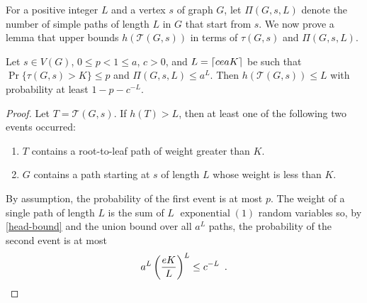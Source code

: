 \documentclass{patmorin}
\DeclareMathOperator{\exponential}{exponential}
\newcommand{\abas}[1]{\textcolor{orange}{\big[Abbas: #1\big]}}
\newcommand{\tcal}{\mathcal{T}}
\begin{document}
%
%

For a positive integer $L$ and a vertex $s$ of graph $G$, let $\Pi(G,s,L)$ denote the number of simple paths of length $L$ in $G$ that start from $s$.
We now prove a lemma that upper bounds $h(\tcal(G,s))$ in terms of $\tau(G,s)$ and $\Pi(G,s,L)$.


\begin{lem}
   Let $s\in V(G)$, $0\le p<1\leq a$, $c>0$, and
   $L={\lceil ceaK \rceil}$ be such that $\Pr \{\tau(G,s)>K\}\leq p$
   and $\Pi(G,s,L) \leq a^L$. 
   Then  
    $h(\tcal(G,s)) \le L$ with probability at least $1-p-c^{-L}$.
\end{lem}

\begin{proof}
   Let $T = \tcal(G,s)$.
   If $h(T)> L$, then at least one of the following two events occurred:
   \begin{enumerate}
     \item $T$ contains a root-to-leaf path of weight greater than $K$.
     \item $G$ contains a path starting at $s$ of length $L$ whose weight 
        is less than $K$.
   \end{enumerate}
   By assumption, the probability of the first event is at most $p$.  
   The weight of a single path of length $L$ is the sum of $L$ $\exponential(1)$
   random variables so, by \eqref{head-bound} and the union bound over
   all $a^L$ paths, the probability of the second event is at most
   \[
       a^L \left(\frac{eK}{L} \right)^L \le c^{-L}
       \enspace . \qedhere
   \]
\end{proof}
\end{document}

